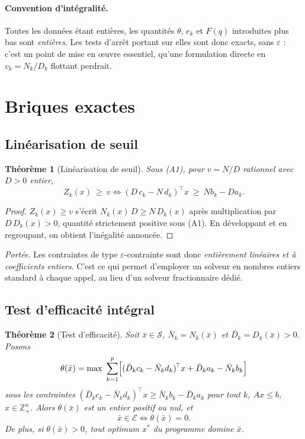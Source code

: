 \documentclass[11pt,a4paper]{article}
\theoremstyle{plain}
\newtheorem{theorem}{Théorème}
\theoremstyle{remark}
\newcommand{\Zk}{Z_k}
\newcommand{\Nk}{N_k}
\newcommand{\Dk}{D_k}
\newcommand{\Ecal}{\mathcal{E}}
\newcommand{\Scal}{\mathcal{S}}
\begin{document}
\paragraph{Convention d'intégralité.}
Toutes les données étant entières, les quantités $\theta$, $e_k$ et $F(q)$
introduites plus bas sont \emph{entières}. Les tests d'arrêt portant sur elles
sont donc exacts, sans $\varepsilon$ : c'est un point de mise en \oe uvre
essentiel, qu'une formulation directe en $v_k=\Nk/\Dk$ flottant perdrait.

\section{Briques exactes}

\subsection{Linéarisation de seuil}

\begin{theorem}[Linéarisation de seuil]\label{th:seuil}
Sous (A1), pour $v=N/D$ rationnel avec $D>0$ entier,
\[
  \Zk(x)\ \ge\ v
  \iff
  (D\,c_k-N\,d_k)^{\!\top}x\ \ge\ N b_k-D a_k .
\]
\end{theorem}

\begin{proof}
$\Zk(x)\ge v$ s'écrit $\Nk(x)\,D\ge N\,\Dk(x)$ après multiplication par
$D\,\Dk(x)>0$, quantité strictement positive sous (A1). En développant et en
regroupant, on obtient l'inégalité annoncée.
\end{proof}

\noindent
\emph{Portée.} Les contraintes de type $\varepsilon$-contrainte sont donc
\emph{entièrement linéaires et à coefficients entiers}. C'est ce qui permet
d'employer un solveur en nombres entiers standard à chaque appel, au lieu d'un
solveur fractionnaire dédié.

\subsection{Test d'efficacité intégral}

\begin{theorem}[Test d'efficacité]\label{th:eff}
Soit $\bar x\in\Scal$, $\bar N_k=\Nk(\bar x)$ et $\bar D_k=\Dk(\bar x)>0$.
Posons
\[
  \theta(\bar x)=\max\ \sum_{k=1}^{p}\Bigl[(\bar D_k c_k-\bar N_k d_k)^{\!\top}x
      +\bar D_k a_k-\bar N_k b_k\Bigr]
\]
sous les contraintes
$(\bar D_k c_k-\bar N_k d_k)^{\!\top}x\ge \bar N_k b_k-\bar D_k a_k$ pour tout
$k$, $Ax\le b$, $x\in\mathbb{Z}^n_+$. Alors $\theta(\bar x)$ est un entier
positif ou nul, et
\[
  \bar x\in\Ecal\iff\theta(\bar x)=0 .
\]
De plus, si $\theta(\bar x)>0$, tout optimum $x^\ast$ du programme domine
$\bar x$.
\end{theorem}
\end{document}
